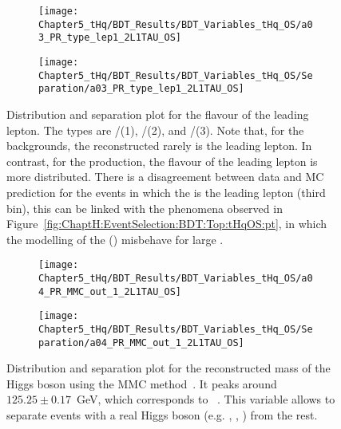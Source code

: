 \begin{figure}[h]
\centering
\begin{subfigure}{.45\textwidth}
  \centering
  \texttt{[image: Chapter5\_tHq/BDT\_Results/BDT\_Variables\_tHq\_OS/a03\_PR\_type\_lep1\_2L1TAU\_OS]}
\end{subfigure}%
\begin{subfigure}{.55\textwidth}
  \centering
  \texttt{[image: Chapter5\_tHq/BDT\_Results/BDT\_Variables\_tHq\_OS/Separation/a03\_PR\_type\_lep1\_2L1TAU\_OS]}
\end{subfigure}
\caption{Distribution and separation plot for the flavour of the leading lepton. The types are 
\Pelectron/\APelectron (1), \Pmuon/\APmuon (2), and \Ptauon/\APtauon(3). Note that, for the backgrounds,
the reconstructed \tauhad rarely is the leading lepton. In contrast, for the \tHq production, the 
flavour of the leading lepton is more distributed.
There is a disagreement between data and MC prediction for the events in which the \tauhad is the leading lepton (third bin), this
can be linked with the phenomena observed in Figure~\ref{fig:ChaptH:EventSelection:BDT:Top:tHqOS:pt}, in which the modelling
of the \pt(\tauhad) misbehave for large \pT. } 
\label{fig:Appendix:BDTVARS:tHqOS:a03_PR_type_lep1}
\end{figure}

\begin{figure}[h]
\centering
\begin{subfigure}{.45\textwidth}
  \centering
  \texttt{[image: Chapter5\_tHq/BDT\_Results/BDT\_Variables\_tHq\_OS/a04\_PR\_MMC\_out\_1\_2L1TAU\_OS]}
\end{subfigure}%
\begin{subfigure}{.55\textwidth}
  \centering
  \texttt{[image: Chapter5\_tHq/BDT\_Results/BDT\_Variables\_tHq\_OS/Separation/a04\_PR\_MMC\_out\_1\_2L1TAU\_OS]}
\end{subfigure}
\caption{Distribution and separation plot for the reconstructed mass of the Higgs boson 
using the MMC method~\cite{ELAGIN2011481}. It peaks around $125.25\pm0.17$~GeV, which corresponds to \mH~\cite{Workman:2022ynf}.  %
This variable allows to separate events with a real Higgs boson (e.g. \tWH, \tHq, \ttH) from the rest.}
\label{fig:Appendix:BDTVARS:tHqOS:a04_PR_MMC_out_1}
\end{figure}

